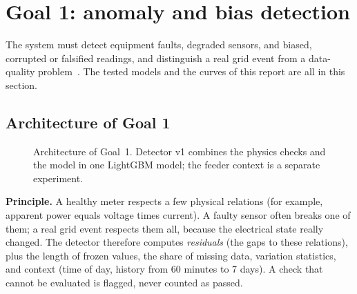 \section{Goal 1: anomaly and bias detection}
\label{sec:goal1}
 The system must detect equipment faults, degraded sensors, and biased, corrupted or falsified readings, and distinguish a real grid event from a data-quality problem~\cite{brief}. The tested models and the curves of this report are all in this section.

\subsection{Architecture of Goal 1}
\begin{figure}[!h]
\centering
{}
\caption{Architecture of Goal~1. Detector v1 combines the physics checks and the model in one LightGBM model; the feeder context is a separate experiment.}
\end{figure}

\textbf{Principle.} A healthy meter respects a few physical relations (for example, apparent power equals voltage times current). A faulty sensor often breaks one of them; a real grid event respects them all, because the electrical state really changed. The detector therefore computes \emph{residuals} (the gaps to these relations), plus the length of frozen values, the share of missing data, variation statistics, and context (time of day, history from 60 minutes to 7 days). A check that cannot be evaluated is flagged, never counted as passed.

